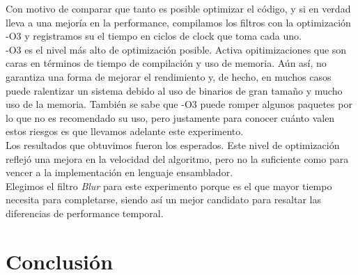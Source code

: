 \documentclass[10pt,a4paper,spanish]{article}
\begin{document}
Con motivo de comparar que tanto es posible optimizar el código, y si en verdad lleva a una mejoría en la performance, compilamos los filtros con la optimización -O3 y registramos su el tiempo en ciclos de clock que toma cada uno. \\

-O3 es el nivel más alto de optimización posible. Activa opitimizaciones que son caras en términos de tiempo de compilación y uso de memoria. Aún así, no garantiza una forma de mejorar el rendimiento y, de hecho, en muchos casos puede ralentizar un sistema debido al uso de binarios de gran tamaño y mucho uso de la memoria. También se sabe que -O3 puede romper algunos paquetes por lo que no es recomendado su uso, pero justamente para conocer cuánto valen estos riesgos es que llevamos adelante este experimento. \\

Los resultados que obtuvimos fueron los esperados. Este nivel de optimización reflejó una mejora en la velocidad del algoritmo, pero no la suficiente como para vencer a la implementación en lenguaje ensamblador. \\

Elegimos el filtro \textit{Blur} para este experimento porque es el que mayor tiempo necesita para completarse, siendo así un mejor candidato para resaltar las diferencias de performance temporal. \\


\section{Conclusión}
\end{document}
